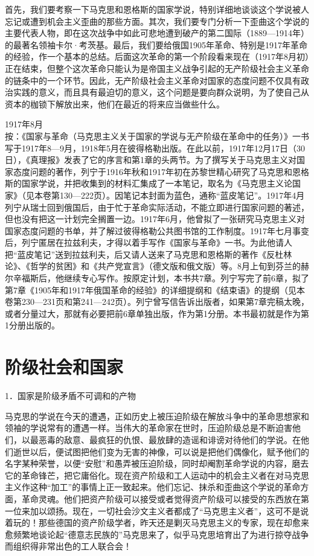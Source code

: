\documentclass[UTF8, 12pt, a4paper]{ctexrep}
\begin{document}
首先，我们要考察一下马克思和恩格斯的国家学说，特别详细地谈谈这个学说被人忘记或遭到机会主义歪曲的那些方面。其次，我们要专门分析一下歪曲这个学说的主要代表人物，即在这次战争中如此可悲地遭到破产的第二国际（1889—1914年）的最著名领袖卡尔·考茨基。最后，我们要给俄国1905年革命、特别是1917年革命的经验，作一个基本的总结。后面这次革命的第一个阶段看来现在（1917年8月初）正在结束，但整个这次革命只能认为是帝国主义战争引起的无产阶级社会主义革命的链条中的一个环节。因此，无产阶级社会主义革命对国家的态度问题不仅具有政治实践的意义，而且具有最迫切的意义，这个问题是要向群众说明，为了使自己从资本的枷锁下解放出来，他们在最近的将来应当做些什么。

\hfill 1917年8月\\

按：《国家与革命（马克思主义关于国家的学说与无产阶级在革命中的任务）》一书写于1917年8—9月，1918年5月在彼得格勒出版。在此以前，1917年12月17日（30日），《真理报》发表了它的序言和第1章的头两节。为了撰写关于马克思主义对国家态度问题的著作，列宁于1916年秋和1917年初在苏黎世精心研究了马克思和恩格斯的国家学说，并把收集到的材料汇集成了一本笔记，取名为《马克思主义论国家》（见本卷第130—222页）。因笔记本封面为蓝色，通称“蓝皮笔记”。1917年4月列宁从瑞士回到俄国后，由于忙于革命实际活动，不能立即进行国家问题的著述，但也没有把这一计划完全搁置一边。1917年6月，他曾拟了一张研究马克思主义对国家态度问题的书单，并了解过彼得格勒公共图书馆的工作制度。1917年七月事变后，列宁匿居在拉兹利夫，才得以着手写作《国家与革命》一书。为此他请人把“蓝皮笔记”送到拉兹利夫，后又请人送来了马克思和恩格斯的著作《反杜林论》、《哲学的贫困》和《共产党宣言》（德文版和俄文版）等。8月上旬到芬兰的赫尔辛福斯后，他继续专心写作。按原定计划，本书共7章。列宁写完了前6章，拟了第7章《1905年和1917年俄国革命的经验》的详细提纲和《结束语》的提纲（见本卷第230—231页和第241—242页）。列宁曾写信告诉出版者，如果第7章完稿太晚，或者分量过大，那就有必要把前6章单独出版，作为第1分册。本书最初就是作为第1分册出版的。

\chapter{阶级社会和国家}

1．国家是阶级矛盾不可调和的产物

马克思的学说在今天的遭遇，正如历史上被压迫阶级在解放斗争中的革命思想家和领袖的学说常有的遭遇一样。当伟大的革命家在世时，压迫阶级总是不断迫害他们，以最恶毒的敌意、最疯狂的仇恨、最放肆的造谣和诽谤对待他们的学说。在他们逝世以后，便试图把他们变为无害的神像，可以说是把他们偶像化，赋予他们的名字某种荣誉，以便“安慰”和愚弄被压迫阶级，同时却阉割革命学说的内容，磨去它的革命锋芒，把它庸俗化。现在资产阶级和工人运动中的机会主义者在对马克思主义作这种“加工”的事情上正一致起来。他们忘记、抹杀和歪曲这个学说的革命方面，革命灵魂。他们把资产阶级可以接受或者觉得资产阶级可以接受的东西放在第一位来加以颂扬。现在，一切社会沙文主义者都成了“马克思主义者”，这可不是说着玩的！那些德国的资产阶级学者，昨天还是剿灭马克思主义的专家，现在却愈来愈频繁地谈论起“德意志民族的”马克思来了，似乎马克思培育出了为进行掠夺战争而组织得非常出色的工人联合会！
\end{document}
